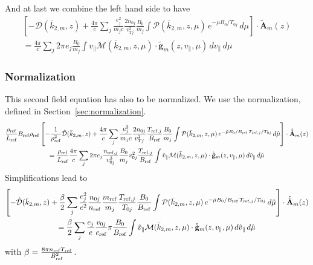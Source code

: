 And at last we combine the left hand side to have
\begin{multline*}
  \left[
    -\mathcal{D}(\bar k_{2,m},z)
    + \frac{4\pi}{c}\sum_j\frac{e_j^2}{m_jc} \frac{2n_{0j}}{v_{Tj}^2}\frac{B_0}{m_j}\int \mathcal{P}(\bar{k}_{2,m},z,\mu)
    \,e^{-\mu B_0/T_{0j}}\,d\mu
  \right] \cdot\tilde{\mathbf{A}}_m(z)\\
  = \frac{4\pi}{c}\sum_j 2\pi e_j \frac{B_0}{m_j}\int v_\| 
   \mathcal{M}(\bar{k}_{2,m},z,\mu)\cdot\tilde{\mathbf{g}}_m(z,v_\|,\mu)\,dv_\|\,d\mu
\end{multline*}


\subsubsection{Normalization}
\label{sec:norm_amp}
This second field equation has also to be normalized. We use the
normalization, defined in Section~\ref{sec:normalization}.
\begin{multline*}
  \frac{\rho_{\mathrm{ref}}}{L_{\mathrm{ref}}}B_{\mathrm{ref}}\rho_{\mathrm{ref}}\left[
    -\frac{1}{\rho_{\mathrm{ref}}^2}\hat{\mathcal{D}}(\bar k_{2,m},z)
    +\frac{4\pi}{c}\sum_j\frac{e_j^2}{m_jc} \frac{2n_{0j}}{v_{Tj}^2}
    \frac{T_{\mathrm{ref},j}}{B_{\mathrm{ref}}}\frac{B_0}{m_j}\int \mathcal{P}(\bar{k}_{2,m},z,\mu)
    \,e^{-\hat{\mu} B_0/B_{\mathrm{ref}}\,T_{\mathrm{ref},j}/T_{0j}}\,d\hat{\mu}
  \right] \cdot\hat{\tilde{\mathbf{A}}}_m(z)\\
  = \frac{\rho_{\mathrm{ref}}}{L_{\mathrm{ref}}}\frac{4\pi}{c}
  \sum_j 2\pi e_j \frac{n_{\mathrm{ref},j}}{v_{0j}^3}\frac{B_0}{m_j}v_{0j}^2\frac{T_{\mathrm{ref},j}}{B_{\mathrm{ref}}} \int \hat{v}_\| 
   \mathcal{M}(\bar{k}_{2,m},z,\mu)\cdot\hat{\tilde{\mathbf{g}}}_m(z,v_\|,\mu)\,d\hat{v}_\|\,d\hat{\mu}
\end{multline*}
Simplifications lead to
\begin{multline*}
  \left[
    -\hat{\mathcal{D}}(\bar k_{2,m},z)
    +\frac{\beta}{2}\sum_j\frac{e_j^2}{e^2}\frac{n_{0j}}{n_\mathrm{ref}}\frac{m_{\mathrm{ref}}}{m_j} 
    \frac{T_{\mathrm{ref},j}}{T_{0j}}\frac{B_0}{B_{\mathrm{ref}}}\int \mathcal{P}(\bar{k}_{2,m},z,\mu)
    \,e^{-\hat{\mu} B_0/B_{\mathrm{ref}}\,T_{\mathrm{ref},j}/T_{0j}}\,d\hat{\mu}
  \right] \cdot\hat{\tilde{\mathbf{A}}}_m(z)\\
  = \frac{\beta}{2}\sum_j \frac{e_j}{e} \frac{v_{0j}}{c_{\mathrm{ref}}}\pi\frac{B_0}{B_{\mathrm{ref}}}\int \hat{v}_\| 
   \mathcal{M}(\bar{k}_{2,m},z,\mu)\cdot\hat{\tilde{\mathbf{g}}}_m(z,v_\|,\mu)\,d\hat{v}_\|\,d\hat{\mu}
\end{multline*}
with $\beta = \frac{8\pi n_{\mathrm{ref}} T_{\mathrm{ref}}}{B_{\mathrm{ref}}^2}$.


